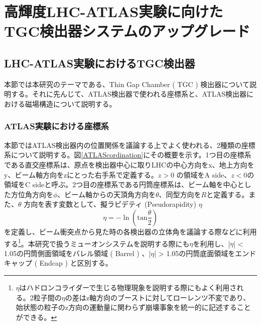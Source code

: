 \chapter{高輝度LHC-ATLAS実験に向けたTGC検出器システムのアップグレード}
\label{chap_TGC}




\section{LHC-ATLAS実験におけるTGC検出器}
本節では本研究のテーマである、Thin Gap Chamber ( TGC ) 検出器について説明する。それに先んじて、ATLAS検出器で使われる座標系と、ATLAS検出器における磁場構造について説明する。

\subsection{ATLAS実験における座標系}
本節ではATLAS検出器内の位置関係を議論する上でよく使われる、2種類の座標系について説明する。図\ref{ATLAScordination}にその概要を示す。1つ目の座標系である直交座標系は、原点を検出器中心に取りLHCの中心方向をx、地上方向をy、ビーム軸方向をzにとった右手系で定義する。$z>0$ の領域をA side、$z<0$の領域をC sideと呼ぶ。2つ目の座標系である円筒座標系は、ビーム軸を中心とした方位角方向を$\phi$、ビーム軸からの天頂角方向を$\theta$、同型方向を$R$と定義する。また、$\theta$ 方向を表す変数として、擬ラピデティ  (Pseudorapidity) $\eta$
\begin{equation}
    \eta = -\ln(\mathrm{tan}\frac{\theta}{2})
\end{equation}
を定義し、ビーム衝突点から見た時の各検出器の立体角を議論する際などに利用する\footnote{$\eta$はハドロンコライダーで生じる物理現象を説明する際にもよく利用される。2粒子間の$\eta$の差はz軸方向のブーストに対してローレンツ不変であり、始状態の粒子のz方向の運動量に関わらず崩壊事象を統一的に記述することができる。}。本研究で扱うミューオンシステムを説明する際にも$\eta$を利用し、|$\eta$| < 1.05の円筒側面領域をバレル領域 ( Barrel ) 、|$\eta$| > 1.05の円筒底面領域をエンドキャップ ( Endcap ) と区別する。

